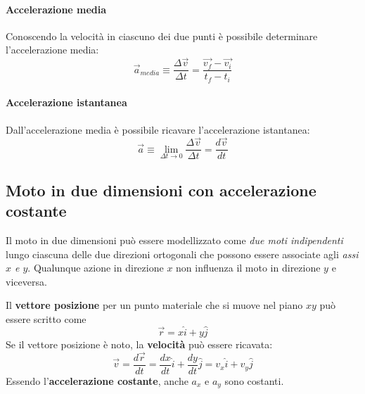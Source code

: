 \documentclass[12pt,oneside]{book}
\begin{document}
\paragraph{Accelerazione media}
Conoscendo la velocità in ciascuno dei due punti è possibile determinare l'accelerazione media:
\begin{equation*}
    \vec{a}_{media} \equiv \frac{\Delta \vec{v}}{\Delta t} = \frac{\vec{v_f} - \vec{v_i}}{t_f - t_i}
\end{equation*}

\paragraph{Accelerazione istantanea}
Dall'accelerazione media è possibile ricavare l'accelerazione istantanea:
\begin{equation*}
    \vec{a} \equiv \lim_{\Delta t \to 0} \frac{\Delta \vec{v}}{\Delta t} = \frac{d\vec{v}}{dt}
\end{equation*}

\newpage
\subsection{Moto in due dimensioni con accelerazione costante}
Il moto in due dimensioni può essere modellizzato come \emph{due moti indipendenti} lungo
ciascuna delle due direzioni ortogonali che possono essere associate agli \emph{assi $x$ e $y$}.
Qualunque azione in direzione $x$ non influenza il moto in direzione $y$ e viceversa.

\begin{figure}[h]
    \centering
\end{figure}
\noindent Il \textbf{vettore posizione} per un punto materiale che si muove nel piano $xy$ può essere scritto come
\begin{equation*}
    \vec{r} = x\hat{i} + y\hat{j}
\end{equation*}
Se il vettore posizione è noto, la \textbf{velocità} può essere ricavata:
\begin{equation*}
    \vec{v} = \frac{d\vec{r}}{dt} = \frac{dx}{dt}\hat{i}+\frac{dy}{dt}\hat{j} = v_x \hat{i} + v_y \hat{j}
\end{equation*}
Essendo l'\textbf{accelerazione costante}, anche $a_x$ e $a_y$ sono costanti.
\end{document}
